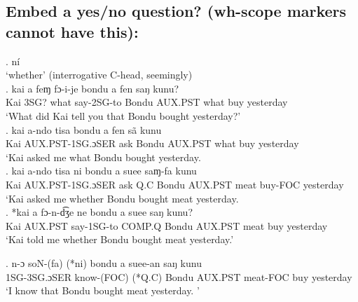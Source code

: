 \documentclass{assets/fieldnotes}
\begin{document}
\subsection{Embed a yes/no question? (wh-scope markers cannot have this):}


\ex. ní \\
`whether' (interrogative C-head, seemingly) \\ 

\exg. kai a feɱ fɔ-i-je bondu a fen saŋ kunu?\\
Kai 3SG? what say-2SG-to Bondu AUX.PST what buy yesterday\\
`What did Kai tell you that Bondu bought yesterday?' \\

\exg. kai a-ndo tisa bondu a fen sã kunu\\
Kai AUX.PST-1SG.ɔSER ask Bondu AUX.PST what buy yesterday\\
`Kai asked me what Bondu bought yesterday. \\ 

\exg. kai a-ndo tisa ni bondu a suee saɱ-fa kunu\\
Kai AUX.PST-1SG.ɔSER ask Q.C Bondu AUX.PST meat buy-FOC yesterday\\
`Kai asked me whether Bondu bought meat yesterday.\\ 

\exg. *kai a fɔ-n-d͡ʒe ne bondu a suee saŋ kunu?\\
Kai AUX.PST say-1SG-to COMP.Q Bondu AUX.PST meat buy yesterday\\
`Kai told me whether Bondu bought meat yesterday.' \\


\exg. n-ɔ soN-(fa) (*ni) bondu a suee-an saŋ kunu\\
1SG-3SG.ɔSER know-(FOC) (*Q.C) Bondu AUX.PST meat-FOC buy yesterday\\
`I know that Bondu bought meat yesterday. ' \\

\\
\end{document}
